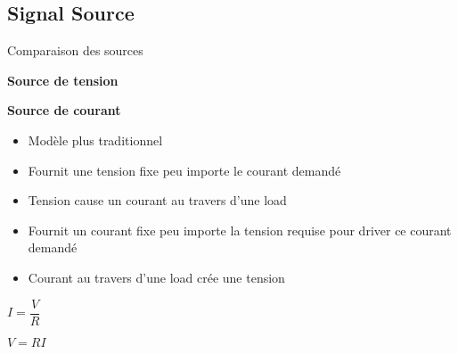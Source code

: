 \subsection[2min-Pascal]{Signal Source }
\pascalbackground
\begin{frame}{Comparaison des sources}
    \begin{twocolumns}
        \leftcol
        \begin{center}
            \textbf{Source de tension}
        \end{center}
        \rightcol
        \begin{center}
            \textbf{Source de courant}
        \end{center}
    \end{twocolumns}

    \begin{twocolumns}[0.55]
        \leftcol
        \begin{itemize}
            \item Modèle plus traditionnel
            \item Fournit une tension fixe peu importe le courant demandé
            \item Tension cause un courant au travers d'une load
        \end{itemize}

        \rightcol
        \begin{itemize}
            \item Fournit un courant fixe peu importe la tension requise pour driver ce courant demandé
            \item Courant au travers d'une load crée une tension
        \end{itemize}
        
    \end{twocolumns}

    \vspace{-8pt}
    \begin{twocolumns}
        \leftcol
        \begin{center}
            $I = \dfrac{V}{R}$
        \end{center}
        \rightcol
        \begin{center}
            $V = RI$
        \end{center}
    \end{twocolumns}

    \vfill


\end{frame}
